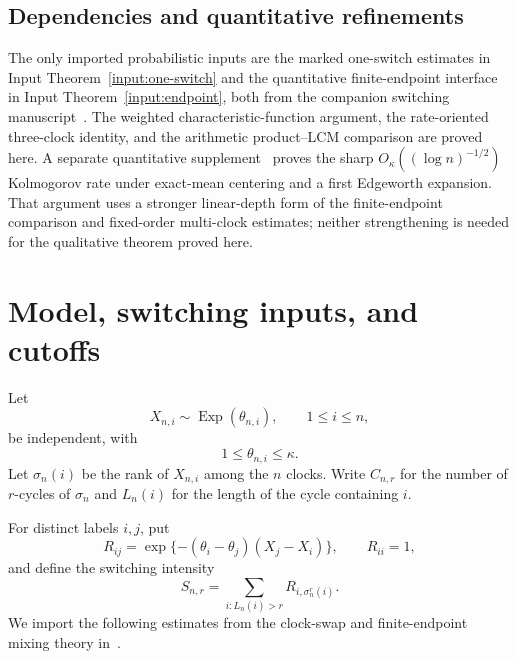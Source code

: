 \documentclass[11pt]{article}
\theoremstyle{remark}
\newcommand{\Exp}{\operatorname{Exp}}
\begin{document}
\subsection*{Dependencies and quantitative refinements}

The only imported probabilistic inputs are the marked one-switch estimates
in Input Theorem~\ref{input:one-switch} and the quantitative
finite-endpoint interface in Input Theorem~\ref{input:endpoint}, both from
the companion switching manuscript~\cite{LongSwitch2026}.  The weighted
characteristic-function argument, the rate-oriented three-clock identity,
and the arithmetic product--LCM comparison are proved here.  A separate
quantitative supplement~\cite{LongBerry2026} proves the sharp
$O_\kappa((\log n)^{-1/2})$ Kolmogorov rate under exact-mean centering and a
first Edgeworth expansion.  That argument uses a stronger linear-depth form
of the finite-endpoint comparison and fixed-order multi-clock estimates;
neither strengthening is needed for the qualitative theorem proved here.

\section{Model, switching inputs, and cutoffs}

Let
\[
 X_{n,i}\sim\Exp(\theta_{n,i}),\qquad 1\leq i\leq n,
\]
be independent, with
\begin{equation}\label{eq:comparable}
 1\leq\theta_{n,i}\leq\kappa.
\end{equation}
Let $\sigma_n(i)$ be the rank of $X_{n,i}$ among the $n$ clocks.  Write
$C_{n,r}$ for the number of $r$-cycles of $\sigma_n$ and $L_n(i)$ for the
length of the cycle containing $i$.

For distinct labels $i,j$, put
\[
 R_{ij}=\exp\{-(\theta_i-\theta_j)(X_j-X_i)\},
 \qquad R_{ii}=1,
\]
and define the switching intensity
\[
 S_{n,r}=\sum_{i:L_n(i)>r}R_{i,\sigma_n^r(i)}.
\]
We import the following estimates from the clock-swap and finite-endpoint
mixing theory in~\cite{LongSwitch2026}.
\end{document}
